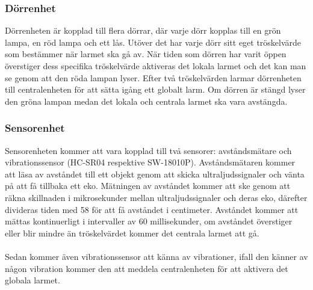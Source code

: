 \documentclass{article}
\begin{document}
\subsubsection{Dörrenhet}

Dörrenheten är kopplad till flera dörrar, där varje dörr kopplas till en grön lampa, en röd lampa och ett lås. 
Utöver det har varje dörr sitt eget tröskelvärde som bestämmer när larmet ska gå av. 
När tiden som dörren har varit öppen överstiger dess specifika tröskelvärde aktiveras det lokala larmet och det kan man se genom att den röda lampan lyser.
Efter två tröskelvärden larmar dörrenheten till centralenheten för att sätta igång ett globalt larm. 
Om dörren är stängd lyser den gröna lampan medan det lokala och centrala larmet ska vara avstängda. 

\subsubsection{Sensorenhet}

Sensorenheten kommer att vara kopplad till två sensorer: avståndsmätare och vibrationssensor (HC-SR04 respektive SW-18010P).
Avståndsmätaren kommer att läsa av avståndet till ett objekt genom att skicka ultraljudssignaler och vänta på att få tillbaka ett eko. 
Mätningen av avståndet kommer att ske genom att räkna skillnaden i mikrosekunder mellan ultraljudssignaler och deras eko, därefter divideras tiden med 58 för att få avståndet i centimeter. 
Avståndet kommer att mättas kontinuerligt i intervaller av 60 millisekunder, om avståndet överstiger eller blir mindre än tröskelvärdet kommer det centrala larmet att gå.\\
\\
Sedan kommer även vibrationssensor att känna av vibrationer, ifall den känner av någon vibration kommer den att meddela centralenheten för att aktivera det globala larmet.
\end{document}
